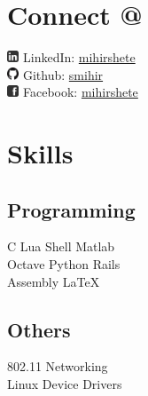 \documentclass[letterpaper]{deedy-resume} %
\begin{document}
\begin{minipage}[t]{0.33\textwidth} %


\section{Connect @}

\includegraphics[height=10pt]{Linkedin-256.png} LinkedIn:  \href{https://www.linkedin.com/in/mihirshete}{mihirshete} \\
\includegraphics[height=10pt]{GitHub-Mark-32px.png} Github: \href{https://github.com/smihir}{smihir} \\
\includegraphics[height=10pt]{Facebook-256.png} Facebook:  \href{https://www.facebook.com/mihirshete}{mihirshete} \\

\sectionspace %


\section{Skills}

\subsection{Programming}
C \textbullet{} Lua \textbullet{} Shell \textbullet{} Matlab \\
Octave \textbullet{} Python \textbullet{} Rails \\
Assembly \textbullet{} \LaTeX
\vspace{\topsep}
\subsection{Others}
802.11 \textbullet{} Networking \textbullet{} \\
Linux Device Drivers


\end{minipage}
\end{document}
